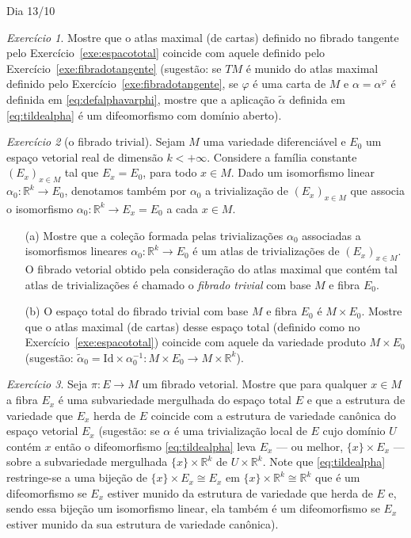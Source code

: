 \documentclass[oneside,11pt]{amsart}
\newcommand{\R}{\mathds R}
\newcommand{\Id}{\mathrm{Id}}
\theoremstyle{remark}\newtheorem{exercise}{Exercício}[section]
\theoremstyle{plain}\newtheorem{teo}{Teorema}[section]
\theoremstyle{plain}\newtheorem{lem}[teo]{Lema}
\theoremstyle{plain}\newtheorem{prop}[teo]{Proposição}
\theoremstyle{definition}\newtheorem{defin}[teo]{Definição}
\theoremstyle{remark}\newtheorem{rem}[teo]{Observação}
\theoremstyle{definition}\newtheorem{example}[teo]{Exemplo}
\numberwithin{equation}{section}
\begin{document}
\begin{section}{Dia 13/10}
\begin{exercise}
Mostre que o atlas maximal (de cartas) definido no fibrado tangente pelo Exercício~\ref{exe:espacototal} coincide com aquele definido pelo Exercício~\ref{exe:fibradotangente}
(sugestão: se $TM$ é munido do atlas maximal definido pelo Exercício~\ref{exe:fibradotangente}, se $\varphi$ é uma carta de $M$
e $\alpha=\alpha^\varphi$ é definida em \eqref{eq:defalphavarphi}, mostre que a aplicação $\tilde\alpha$ definida em \eqref{eq:tildealpha}
é um difeomorfismo com domínio aberto).
\end{exercise}

\begin{exercise}[o fibrado trivial]\label{exe:fibradotrivial}
Sejam $M$ uma variedade diferenciável e $E_0$ um espaço vetorial real de dimensão $k<+\infty$. Considere a família constante $(E_x)_{x\in M}$
tal que $E_x=E_0$, para todo $x\in M$. Dado um isomorfismo linear $\alpha_0:\R^k\to E_0$, denotamos também por $\alpha_0$ a trivialização
de $(E_x)_{x\in M}$ que associa o isomorfismo $\alpha_0:\R^k\to E_x=E_0$ a cada $x\in M$.
\begin{itemize}
\item[(a)] Mostre que a coleção formada pelas trivializações $\alpha_0$ associadas a isomorfismos lineares $\alpha_0:\R^k\to E_0$ é um atlas
de trivializações de $(E_x)_{x\in M}$. O fibrado vetorial obtido pela consideração do atlas maximal que contém tal atlas de trivializações
é chamado o {\em fibrado trivial\/} com base $M$ e fibra $E_0$.
\item[(b)] O espaço total do fibrado trivial com base $M$ e fibra $E_0$ é $M\times E_0$. Mostre que o atlas maximal (de cartas) desse
espaço total (definido como no Exercício~\ref{exe:espacototal}) coincide com aquele da variedade produto $M\times E_0$ (sugestão:
$\tilde\alpha_0=\Id\times\alpha_0^{-1}:M\times E_0\to M\times\R^k$).
\end{itemize}
\end{exercise}

\begin{exercise}\label{exe:fibramergulhada}
Seja $\pi:E\to M$ um fibrado vetorial.
Mostre que para qualquer $x\in M$ a fibra $E_x$ é uma subvariedade mergulhada do espaço total $E$ e que a estrutura de variedade que $E_x$ herda de $E$
coincide com a estrutura de variedade canônica do espaço vetorial $E_x$ (sugestão: se $\alpha$ é uma trivialização local de $E$ cujo domínio $U$ contém
$x$ então o difeomorfismo \eqref{eq:tildealpha} leva $E_x$ --- ou melhor, $\{x\}\times E_x$ --- sobre a subvariedade mergulhada
$\{x\}\times\R^k$ de $U\times\R^k$. Note que \eqref{eq:tildealpha} restringe-se a uma bijeção de $\{x\}\times E_x\cong E_x$ em $\{x\}\times\R^k\cong\R^k$ que
é um difeomorfismo se $E_x$ estiver munido da estrutura de variedade que herda de $E$ e, sendo essa bijeção um isomorfismo linear, ela também
é um difeomorfismo se $E_x$ estiver munido da sua estrutura de variedade canônica).
\end{exercise}


\end{section}
\end{document}
